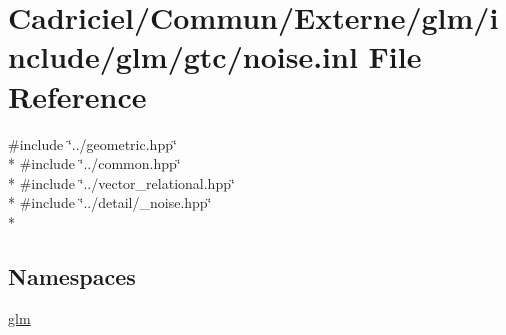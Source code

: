 \hypertarget{noise_8inl}{}\section{Cadriciel/\+Commun/\+Externe/glm/include/glm/gtc/noise.inl File Reference}
\label{noise_8inl}
{\ttfamily \#include \char`\"{}../geometric.\+hpp\char`\"{}}\\*
{\ttfamily \#include \char`\"{}../common.\+hpp\char`\"{}}\\*
{\ttfamily \#include \char`\"{}../vector\+\_\+relational.\+hpp\char`\"{}}\\*
{\ttfamily \#include \char`\"{}../detail/\+\_\+noise.\+hpp\char`\"{}}\\*
\subsection*{Namespaces}
\begin{DoxyCompactItemize}
\item 
 \hyperlink{namespaceglm}{glm}
\end{DoxyCompactItemize}
